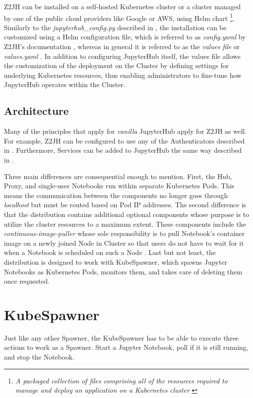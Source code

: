 \documentclass[
  digital,     %
  oneside,     %
  nosansbold,  %
  nocolorbold, %
  lof,         %
  lot,         %
]{fithesis4}
\begin{document}
Z2JH can be installed on a self-hosted Kubernetes cluster or a cluster managed by one of the public cloud providers like Google or AWS, using Helm chart
\footnote{\emph{A packaged collection of files comprising all of the resources required to manage and deploy an application on a Kubernetes cluster} \cite{helm_charts}}. Similarly to the \emph{jupyterhub\_config.py} described in , the installation can be customized using a Helm configuration file, which is referred to as \emph{config.yaml} by Z2JH's documentation \cite{jupyterhub_z2jh_config}, whereas in general it is referred to as the \emph{values file} or \emph{values.yaml} \cite{helm_charts}. In addition to configuring JupyterHub itself, the values file allows the customization of the deployment on the Cluster by defining settings for underlying Kubernetes resources, thus enabling administrators to fine-tune how JupyterHub operates within the Cluster.

\subsection{Architecture}
Many of the principles that apply for \emph{vanilla} JupyterHub apply for Z2JH as well. For example, Z2JH can be configured to use any of the Authenticators described in . Furthermore, Services can be added to JupyterHub the same way described in .

Three main differences are consequential enough to mention. First, the Hub, Proxy, and single-user Notebooks run within separate Kubernetes Pods. This means the communication between the components no longer goes through \emph{localhost} but must be routed based on Pod IP addresses. The second difference is that the distribution contains additional optional components whose purpose is to utilize the cluster resources to a maximum extent. These components include the \emph{continuous-image-puller} whose sole responsibility is to pull Notebook's container image on a newly joined Node in Cluster so that users do not have to wait for it when a Notebook is scheduled on such a Node \cite{jupyterhub_optimizations}. Last but not least, the distribution is designed to work with KubeSpawner, which spawns Jupyter Notebooks as Kubernetes Pods, monitors them, and takes care of deleting them once requested.

\section{KubeSpawner}
\label{sec:kubespawner}
Just like any other Spawner, the KubeSpawner has to be able to execute three actions to work as a Spawner. Start a Jupyter Notebook, poll if it is still running, and stop the Notebook.
\end{document}
